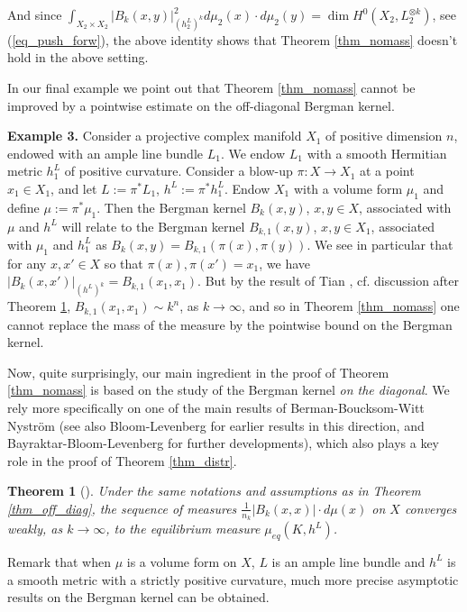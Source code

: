 \documentclass[12pt]{article}
\numberwithin{equation}{section}
\theoremstyle{theorem}
\newtheorem{thm}{Theorem}[section]
\theoremstyle{definition}
\theoremstyle{remark}
\begin{document}
	And since $\int_{X_2 \times X_2} |B_k(x, y)|^2_{(h^L_2)^k} d \mu_2 (x) \cdot d \mu_2 (y) = \dim H^0(X_2, L_2^{\otimes k})$, see (\ref{eq_push_forw}), the above identity shows that Theorem \ref{thm_nomass} doesn't hold in the above setting.
	\par 
	In our final example we point out that Theorem \ref{thm_nomass} cannot be improved by a pointwise estimate on the off-diagonal Bergman kernel.
\par 
	\textbf{Example 3.}
	Consider a projective complex manifold $X_1$ of positive dimension $n$, endowed with an ample line bundle $L_1$.
	We endow $L_1$ with a smooth Hermitian metric $h^L_1$ of positive curvature.
	Consider a blow-up $\pi : X \to X_1$ at a point $x_1 \in X_1$, and let $L := \pi^* L_1$, $h^L := \pi^* h^L_1$.
	Endow $X_1$ with a volume form $\mu_1$ and define $\mu := \pi^* \mu_1$.
	Then the Bergman kernel $B_k(x, y)$, $x , y \in X$, associated with $\mu$ and $h^L$ will relate to the Bergman kernel $B_{k, 1}(x, y)$, $x , y \in X_1$, associated with $\mu_1$ and $h^L_1$ as $B_k(x, y) = B_{k, 1}(\pi(x), \pi(y))$.
	We see in particular that for any $x, x' \in X$ so that $\pi(x), \pi(x') = x_1$, we have $|B_k(x, x')|_{(h^L)^k} = B_{k, 1}(x_1, x_1)$.
	But by the result of Tian \cite{TianBerg}, cf. discussion after Theorem \ref{thm_diag}, $B_{k, 1}(x_1, x_1) \sim k^n$, as $k \to \infty$, and so in Theorem \ref{thm_nomass} one cannot replace the mass of the measure by the pointwise bound on the Bergman kernel.
	\par 
	Now, quite surprisingly, our main ingredient in the proof of Theorem \ref{thm_nomass} is based on the study of the Bergman kernel \textit{on the diagonal}.
	We rely more specifically on one of the main results of Berman-Boucksom-Witt Nyström \cite{BerBoucNys} (see also Bloom-Levenberg \cite{BloomLeven1,BloomLeven2} for earlier results in this direction, and Bayraktar-Bloom-Levenberg \cite{BayrBloomLeven} for further developments), which also plays a key role in the proof of Theorem \ref{thm_distr}.
	\begin{thm}[{\cite[Theorem B]{BerBoucNys}}]\label{thm_diag}
		Under the same notations and assumptions as in Theorem \ref{thm_off_diag}, the sequence of measures $\frac{1}{n_k} |B_k(x, x)| \cdot d \mu(x)$ on $X$ converges weakly, as $k \to \infty$, to the equilibrium measure $\mu_{eq}(K, h^L)$.
	\end{thm}
	\par 
	Remark that when $\mu$ is a volume form on $X$, $L$ is an ample line bundle and $h^L$ is a smooth metric with a strictly positive curvature, much more precise asymptotic results on the Bergman kernel can be obtained.  
\end{document}
